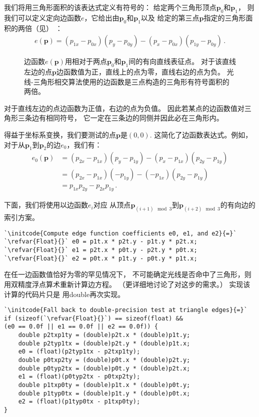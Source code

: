 我们将用三角形面积的该表达式定义有符号的：
给定两个三角形顶点$\bm p_0$和$\bm p_1$，
则我们可以定义定向边函数$e$，它给出由$\bm p_0$和$\bm p_1$以及
给定的第三点$\bm p$指定的三角形面积的两倍（见）
：
\begin{align}\label{eq:3.1}
    e(\bm p)=(p_{1x}-p_{0x})(p_y-p_{0y})-(p_x-p_{0x})(p_{1y}-p_{0y})\, .
\end{align}
\begin{figure}[htbp]
    \centering
    \caption{边函数$e(\bm p)$用相对于两点$\bm p_0$和$\bm p_1$间的有向直线表征点。
        对于该直线左边的点$\bm p$边函数值为正，直线上的点为零，直线右边的点为负。
        光线-三角形相交算法使用的边函数是三点构造的三角形有符号面积的两倍。}
    \label{fig:3.14}
\end{figure}

对于直线左边的点边函数为正值，右边的点为负值。
因此若某点的边函数值对三角形三条边有相同符号，
它一定在三条边的同侧并因此必在三角形内。

得益于坐标系变换，我们要测试的点$\bm p$是$(0,0)$.
这简化了边函数表达式。例如，对于从$\bm p_1$到$\bm p_2$的边$e_0$，我们有：
\begin{align}\label{eq:3.2}
    e_0(\bm p) & =(p_{2x}-p_{1x})(p_y-p_{1y})-(p_x-p_{1x})(p_{2y}-p_{1y})\nonumber \\
               & =(p_{2x}-p_{1x})(-p_{1y})-(-p_{1x})(p_{2y}-p_{1y})\nonumber       \\
               & =p_{1x}p_{2y}-p_{2x}p_{1y}\, .
\end{align}

下面，我们将使用以边函数$e_i$对应
从顶点$\bm p_{(i+1)\mod{3}}$到$\bm p_{(i+2)\mod{3}}$的有向边的索引方案。
\begin{lstlisting}
`\initcode{Compute edge function coefficients e0, e1, and e2}{=}`
`\refvar{Float}{}` e0 = p1t.x * p2t.y - p1t.y * p2t.x;
`\refvar{Float}{}` e1 = p2t.x * p0t.y - p2t.y * p0t.x;
`\refvar{Float}{}` e2 = p0t.x * p1t.y - p0t.y * p1t.x;
\end{lstlisting}

在任一边函数值恰好为零的罕见情况下，
不可能确定光线是否命中了三角形，则用双精度浮点算术重新计算边方程。
（更详细地讨论了对这步的需求。）
实现该计算的代码片只是
用{\ttfamily double}再次实现。
\begin{lstlisting}
`\initcode{Fall back to double-precision test at triangle edges}{=}`
if (sizeof(`\refvar{Float}{}`) == sizeof(float) &&
(e0 == 0.0f || e1 == 0.0f || e2 == 0.0f)) {
    double p2txp1ty = (double)p2t.x * (double)p1t.y;
    double p2typ1tx = (double)p2t.y * (double)p1t.x;
    e0 = (float)(p2typ1tx - p2txp1ty);
    double p0txp2ty = (double)p0t.x * (double)p2t.y;
    double p0typ2tx = (double)p0t.y * (double)p2t.x;
    e1 = (float)(p0typ2tx - p0txp2ty);
    double p1txp0ty = (double)p1t.x * (double)p0t.y;
    double p1typ0tx = (double)p1t.y * (double)p0t.x;
    e2 = (float)(p1typ0tx - p1txp0ty);
}
\end{lstlisting}

